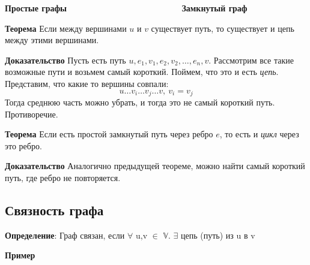 \documentclass{article}
\begin{document}
		\textbf{Простые графы} $\quad \qquad \qquad \qquad \qquad \qquad \qquad$ \textbf{Замкнутый граф}
	
	\textbf{Теорема}
		Если между вершинами $u$ и $v$ существует путь, то существует и цепь между этими вершинами.
	
	\textbf{Доказательство}
		Пусть есть путь $u, e_1, v_1, e_2, v_2, \dots, e_n, v$. Рассмотрим все такие возможные пути и возьмем самый короткий. Поймем, что это и есть \textit{цепь}. Представим, что какие то вершины совпали:
		$$u \dots v_i \dots v_j \dots v,~v_i = v_j$$
		Тогда среднюю часть можно убрать, и тогда это не самый короткий путь. Противоречие.
	
	\textbf{Теорема}
		Если есть простой замкнутый путь через ребро $e$, то есть и \textit{цикл} через это ребро.
	
	\textbf{Доказательство}
		Аналогично предыдущей теореме, можно найти самый короткий путь, где ребро не повторяется.
	
	\subsection{Связность графа}
	   
	  \textbf{Определение}: Граф связан, если $\forall$ u,v $\in$ $\mathbb{V}$. $\exists$ цепь (путь) из u в v
	  
	  \textbf{Пример}
	  
\end{document}
